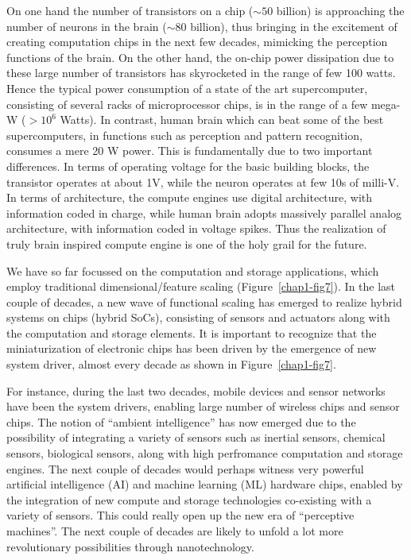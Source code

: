 \begin{multicols}{2}
On one hand the number of transistors on a chip ($\sim 50$ billion) is approaching the number of neurons in the brain ($\sim 80$ billion), thus bringing in the excitement of creating computation chips in the next few decades, mimicking the perception functions of the brain. On the other hand, the on-chip power dissipation due to these large number of transistors has skyrocketed in the range of few 100 watts. Hence the typical power consumption of a state of the art supercomputer, consisting of several racks of microprocessor chips, is in the range of a few mega-W ($> 10^6$ Watts). In contrast, human brain which can beat some of the best supercomputers, in functions such as perception and pattern recognition, consumes a mere 20 W power. This is fundamentally due to two important differences. In terms of operating voltage for the basic building blocks, the transistor operates at about 1V, while the neuron operates at few 10s of milli-V. In terms of architecture, the compute engines use digital architecture, with information coded in charge, while human brain adopts massively parallel analog architecture, with information coded in voltage spikes. Thus the realization of truly brain inspired compute engine is one of the holy grail for the future. 

We have so far focussed on the computation and storage applications, which employ traditional dimensional/feature scaling (Figure~\ref{chap1-fig7}). In the last couple of decades, a new wave of functional scaling has emerged to realize hybrid systems on chips (hybrid SoCs), consisting of sensors and actuators along with the computation and storage elements. It is important to recognize that the miniaturization of electronic chips has been driven by the emergence of new system driver, almost every decade as shown in Figure~\ref{chap1-fig7}.

For instance, during the last two decades, mobile devices and sensor networks have been the system drivers,  enabling large number of wireless chips and sensor chips. The notion of “ambient intelligence” has now emerged due to the possibility of integrating a variety of sensors such as inertial sensors, chemical sensors, biological sensors, along with high perfromance computation and storage engines. The next couple of decades would perhaps witness very powerful artificial intelligence (AI) and machine learning (ML) hardware chips, enabled by the integration of new compute and storage technologies co-existing with a variety of sensors. This could really open up the new era of “perceptive machines”. The next couple of decades are likely to unfold a lot more revolutionary possibilities through nanotechnology.
\end{multicols}

